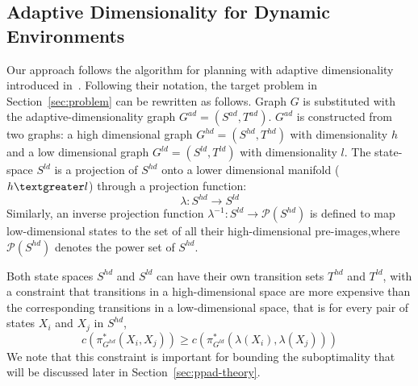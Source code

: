 \subsection{Adaptive Dimensionality for Dynamic Environments}
Our approach follows the algorithm for planning with adaptive dimensionality introduced in~\cite{gochev2011path}.
Following their notation, the target problem in Section~\ref{sec:problem} can be rewritten as follows.
Graph $G$ is substituted with the adaptive-dimensionality graph $G^{ad} = (S^{ad}, T^{ad})$. $G^{ad}$ is constructed from two graphs: a high dimensional graph $G^{hd} = (S^{hd}, T^{hd})$ with dimensionality $h$ and a low dimensional graph $G^{ld} = (S^{ld}, T^{ld})$ with dimensionality $l$. The state-space $S^{ld}$ is a projection of $S^{hd}$ onto a lower dimensional manifold ($ h \textgreater l$) through a projection function:
\begin{equation}
\lambda : S^{hd} \rightarrow S^{ld}
\end{equation}\label{eq:lambda}
Similarly, an inverse projection function $\lambda^{-1} : S^{ld} \rightarrow \mathcal{P}(S^{hd})$ is defined to map low-dimensional states to the set of all their high-dimensional pre-images,where $\mathcal{P}(S^{hd})$ denotes the power set of $S^{hd}$.

Both state spaces $S^{hd}$ and $S^{ld}$ can have their own transition sets $T^{hd}$ and $T^{ld}$,
with a constraint that transitions in a high-dimensional space are more expensive than the corresponding transitions in a low-dimensional space, that is for every pair of states $X_i$ and $X_j$ in $S^{hd}$,
\begin{equation}
c(\pi^*_{G^{hd}}(X_i,X_j)) \geq c(\pi^*_{G^{ld}}(\lambda(X_i), \lambda(X_j)))
\label{eq:cost}
\end{equation}
We note that this constraint is important for bounding the suboptimality that will be discussed later in Section~\ref{sec:ppad-theory}.



